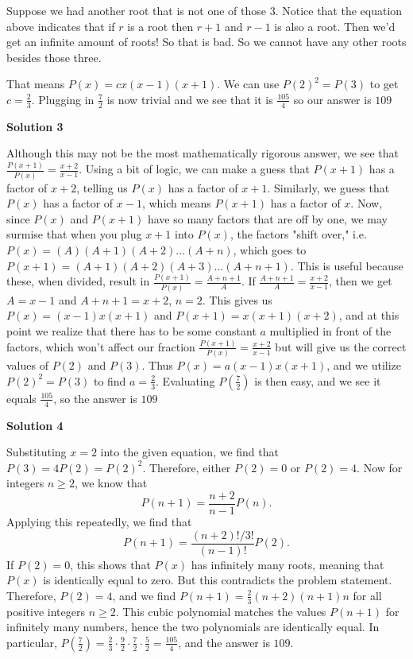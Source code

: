 \begin{enumerate}
 Suppose we had another root that is not one of those $3$. Notice that the equation above indicates that if $r$ is a root then $r+1$ and $r-1$ is also a root. Then we'd get an infinite amount of roots! So that is bad. So we cannot have any other roots besides those three. 

 That means $P(x) = cx(x-1)(x+1)$. We can use $P(2)^2 = P(3)$ to get $c = \frac{2}{3}$. Plugging in $\frac{7}{2}$ is now trivial and we see that it is $\frac{105}{4}$ so our answer is $\boxed{109}$




\textbf{Solution 3}

Although this may not be the most mathematically rigorous answer, we see that $\frac{P(x+1)}{P(x)}=\frac{x+2}{x-1}$. Using a bit of logic, we can make a guess that $P(x+1)$ has a factor of $x+2$, telling us $P(x)$ has a factor of $x+1$. Similarly, we guess that $P(x)$ has a factor of $x-1$, which means $P(x+1)$ has a factor of $x$. Now, since $P(x)$ and $P(x+1)$ have so many factors that are off by one, we may surmise that when you plug $x+1$ into $P(x)$, the factors "shift over," i.e. $P(x)=(A)(A+1)(A+2)...(A+n)$, which goes to $P(x+1)=(A+1)(A+2)(A+3)...(A+n+1)$. This is useful because these, when divided, result in $\frac{P(x+1)}{P(x)}=\frac{A+n+1}{A}$. If $\frac{A+n+1}{A}=\frac{x+2}{x-1}$, then we get $A=x-1$ and $A+n+1=x+2$, $n=2$. This gives us $P(x)=(x-1)x(x+1)$ and $P(x+1)=x(x+1)(x+2)$, and at this point we realize that there has to be some constant $a$ multiplied in front of the factors, which won't affect our fraction $\frac{P(x+1)}{P(x)}=\frac{x+2}{x-1}$ but will give us the correct values of $P(2)$ and $P(3)$. Thus $P(x)=a(x-1)x(x+1)$, and we utilize $P(2)^2=P(3)$ to find $a=\frac{2}{3}$. Evaluating $P \left ( \frac{7}{2} \right )$ is then easy, and we see it equals $\frac{105}{4}$, so the answer is $\boxed{109}$




\textbf{Solution 4}

Substituting $x=2$ into the given equation, we find that $P(3)=4P(2)=P(2)^2$. Therefore, either $P(2)=0$ or $P(2)=4$. Now for integers $n\ge 2$, we know that
 \[P(n+1)=\frac{n+2}{n-1}P(n).\]Applying this repeatedly, we find that
 \[P(n+1)=\frac{(n+2)!/3!}{(n-1)!}P(2).\]If $P(2)=0$, this shows that $P(x)$ has infinitely many roots, meaning that $P(x)$ is identically equal to zero. But this contradicts the problem statement. Therefore, $P(2)=4$, and we find $P(n+1)=\frac{2}{3}(n+2)(n+1)n$ for all positive integers $n\ge2$. This cubic polynomial matches the values $P(n+1)$ for infinitely many numbers, hence the two polynomials are identically equal. In particular, $P\left(\frac72\right)=\frac23\cdot\frac92\cdot\frac72\cdot\frac52=\frac{105}{4}$, and the answer is $\boxed{109}$.


\end{enumerate}
